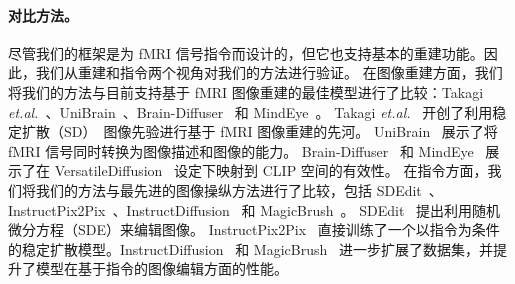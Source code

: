 \paragraph{对比方法。} 尽管我们的框架是为 fMRI 信号指令而设计的，但它也支持基本的重建功能。因此，我们从重建和指令两个视角对我们的方法进行验证。
在图像重建方面，我们将我们的方法与目前支持基于 fMRI 图像重建的最佳模型进行了比较：Takagi \emph{et.al.}~\cite{takagi2023high}、UniBrain~\cite{mai2023unibrain}、Brain-Diffuser~\cite{ozcelik2023brain} 和 MindEye~\cite{scotti2023reconstructing}。
Takagi \emph{et.al.}~\cite{takagi2023high} 开创了利用稳定扩散（SD）~\cite{esser2021taming}图像先验进行基于 fMRI 图像重建的先河。
UniBrain~\cite{mai2023unibrain} 展示了将 fMRI 信号同时转换为图像描述和图像的能力。
Brain-Diffuser~\cite{ozcelik2023brain} 和 MindEye~\cite{scotti2023reconstructing} 展示了在 VersatileDiffusion~\cite{xu2023versatile} 设定下映射到 CLIP 空间的有效性。
在指令方面，我们将我们的方法与最先进的图像操纵方法进行了比较，包括 SDEdit~\cite{meng2021sdedit}、InstructPix2Pix~\cite{brooks2023instructpix2pix}、InstructDiffusion~\cite{geng2023instructdiffusion} 和 MagicBrush~\cite{zhang2024magicbrush}。
SDEdit~\cite{meng2021sdedit} 提出利用随机微分方程（SDE）来编辑图像。
InstructPix2Pix~\cite{brooks2023instructpix2pix} 直接训练了一个以指令为条件的稳定扩散模型。InstructDiffusion~\cite{geng2023instructdiffusion} 和 MagicBrush~\cite{zhang2024magicbrush} 进一步扩展了数据集，并提升了模型在基于指令的图像编辑方面的性能。


